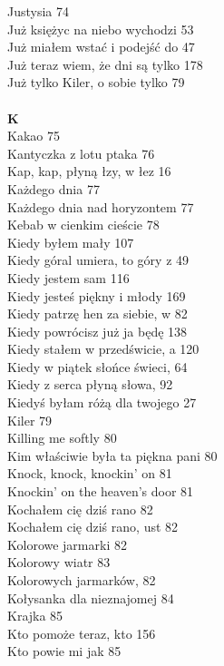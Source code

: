 \documentclass[a5paper, 10pt]{book}
\begin{document}
{\begin{multicols}{3}
    Justysia 74\\
    Już księżyc na niebo wychodzi 53\\
    Już miałem wstać i podejść do 47\\
    Już teraz wiem, że dni są tylko 178\\
    Już tylko Kiler, o sobie tylko 79\\
    \\
    {\footnotesize \textbf{K\\} }
    Kakao 75\\
    Kantyczka z lotu ptaka 76\\
    Kap, kap, płyną łzy, w łez 16\\
    Każdego dnia 77\\
    Każdego dnia nad horyzontem 77\\
    Kebab w cienkim cieście 78\\
    Kiedy byłem mały 107\\
    Kiedy góral umiera, to góry z 49\\
    Kiedy jestem sam 116\\
    Kiedy jesteś piękny i młody 169\\
    Kiedy patrzę hen za siebie, w 82\\
    Kiedy powrócisz już ja będę 138\\
    Kiedy stałem w przedświcie, a 120\\
    Kiedy w piątek słońce świeci, 64\\
    Kiedy z serca płyną słowa, 92\\
    Kiedyś byłam różą dla twojego 27\\
    Kiler 79\\
    Killing me softly 80\\
    Kim właściwie była ta piękna pani 80\\
    Knock, knock, knockin' on 81\\
    Knockin' on the heaven's door 81\\
    Kochałem cię dziś rano 82\\
    Kochałem cię dziś rano, ust 82\\
    Kolorowe jarmarki 82\\
    Kolorowy wiatr 83\\
    Kolorowych jarmarków, 82\\
    Kołysanka dla nieznajomej 84\\
    Krajka 85\\
    Kto pomoże teraz, kto 156\\
    Kto powie mi jak 85\\

\end{multicols}}
\end{document}
